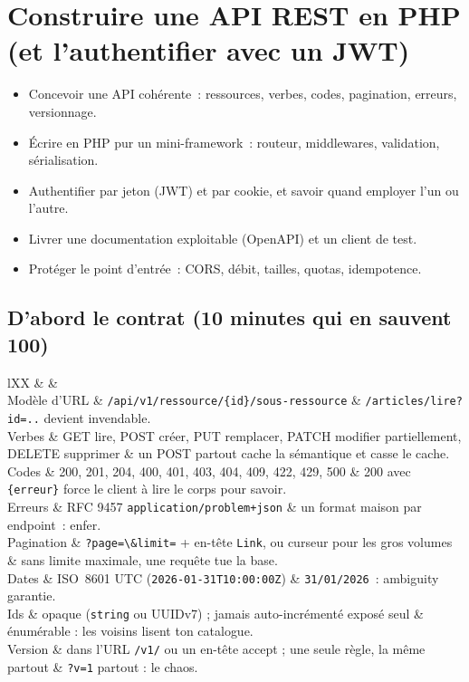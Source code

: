 \chapter{Construire une API REST en PHP (et l'authentifier avec un JWT)}
\label{ch-php-api}

\begin{objectif}
\begin{itemize}
  \item Concevoir une API coh\'erente~: ressources, verbes, codes, pagination, erreurs, versionnage.
  \item \'Ecrire en PHP pur un mini-framework~: routeur, middlewares, validation, s\'erialisation.
  \item Authentifier par jeton (JWT) et par cookie, et savoir quand employer l'un ou l'autre.
  \item Livrer une documentation exploitable (OpenAPI) et un client de test.
  \item Prot\'eger le point d'entr\'ee~: CORS, d\'ebit, tailles, quotas, idempotence.
\end{itemize}
\end{objectif}

\section{D'abord le contrat (10 minutes qui en sauvent 100)}

\begin{tabz}{lXX}
  \headrow {} \&  \&  \\
  \midrule
  Mod\`ele d'URL \& \verb|/api/v1/ressource/{id}/sous-ressource| \& \verb|/articles/lire?id=..| devient invendable. \\
  Verbes \& GET lire, POST cr\'eer, PUT remplacer, PATCH modifier partiellement, DELETE supprimer \& un POST partout cache la s\'emantique et casse le cache. \\
  Codes \& 200, 201, 204, 400, 401, 403, 404, 409, 422, 429, 500 \& 200 avec \verb|{erreur}| force le client \`a lire le corps pour savoir. \\
  Erreurs \& RFC 9457 \verb|application/problem+json| \& un format maison par endpoint~: enfer. \\
  Pagination \& \verb|?page=\&limit=| + en-t\^ete \verb|Link|, ou curseur pour les gros volumes \& sans limite maximale, une requ\^ete tue la base. \\
  Dates \& ISO~8601 UTC (\verb|2026-01-31T10:00:00Z|) \& \verb|31/01/2026|~: ambiguity garantie. \\
  Ids \& opaque (\verb|string| ou UUIDv7) ; jamais auto-incr\'ement\'e expos\'e seul \& \'enum\'erable : les voisins lisent ton catalogue. \\
  Version \& dans l'URL \verb|/v1/| ou un en-t\^ete accept ; une seule r\`egle, la m\^eme partout \& \verb|?v=1| partout : le chaos. \\
\end{tabz}

